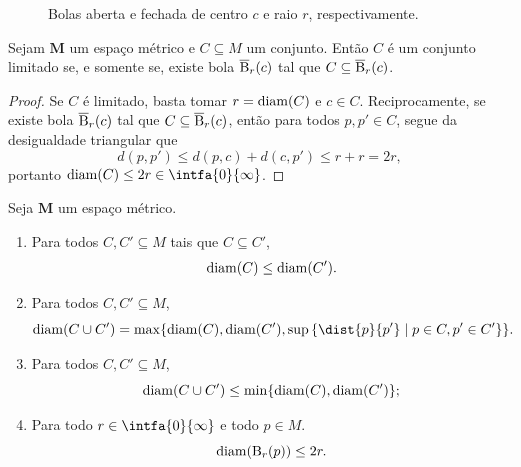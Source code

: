 \begin{figure}
\centering
{}\hspace{3cm}
\caption{Bolas aberta e fechada de centro $c$ e raio $r$, respectivamente.}
\end{figure}

\begin{prop}
Sejam $\bm M$ um espaço métrico e $C \subseteq M$ um conjunto. Então $C$ é um conjunto limitado se, e somente se, existe bola $\overline{\mathrm{B}}_r(c)$ tal que $C \subseteq \overline{\mathrm{B}}_r(c)$.
\end{prop}
\begin{proof}
Se $C$ é limitado, basta tomar $r=\operatorname{diam}(C)$ e $c \in C$. Reciprocamente, se existe bola $\overline{\mathrm{B}}_r(c)$ tal que $C \subseteq \overline{\mathrm{B}}_r(c)$, então para todos $p,p' \in C$, segue da desigualdade triangular que
	\begin{equation*}
	d(p,p') \leq d(p,c)+d(c,p') \leq r+r=2r,
	\end{equation*}
portanto $\diam(C) \leq 2r \in \intfa{0}{\infty}$.
\end{proof}

\begin{exerc}
Seja $\bm M$ um espaço métrico. 
	\begin{enumerate}
	\item Para todos $C,C' \subseteq M$ tais que $C \subseteq C'$,
		\begin{equation*}
		\operatorname{diam}(C) \leq \operatorname{diam} (C').
		\end{equation*}
	
	\item Para todos $C, C' \subseteq M$,
		\begin{equation*}
		\diam(C \cup C') = \max \{ \diam(C),\diam(C'),\sup\set{\dist{p}{p'}}{p \in C, p' \in C'} \}.
		\end{equation*}
	
	\item Para todos $C, C' \subseteq M$,
		\begin{equation*}
		\operatorname{diam}(C \cup C') \leq \min \{ \operatorname{diam}(C),\operatorname{diam}(C') \};
		\end{equation*}
	
	\item Para todo $r \in \intfa{0}{\infty}$ e todo $p \in M$.
	\begin{equation*}
	\operatorname{diam}(\mathrm{B}_r(p)) \leq 2r.
	\end{equation*}
	\end{enumerate}
\end{exerc}

